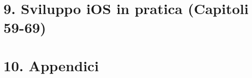 \documentclass[11pt,a4paper,openany]{book}
\begin{document}
\part*{9. Sviluppo iOS in pratica (Capitoli 59-69)}











\appendix
\part*{10. Appendici}









\end{document}
